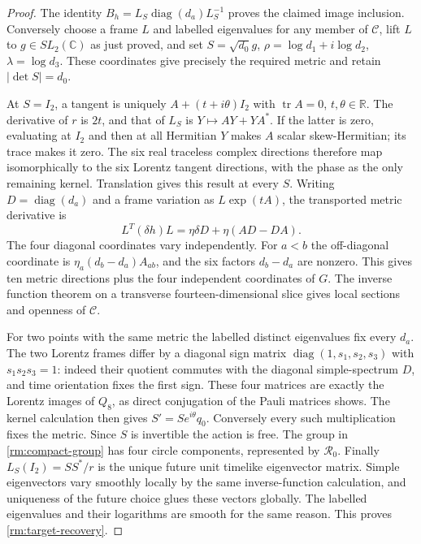 \begin{proof}
The identity $B_h=L_S\operatorname{diag}(d_a)L_S^{-1}$ proves the
claimed image inclusion. Conversely choose a frame $L$ and labelled
eigenvalues for any member of $\mathcal C$, lift $L$ to $g\in
SL_2(\mathbb C)$ as just proved, and set
$S=\sqrt{d_0}g$, $\rho=\log d_1+i\log d_2$,
$\lambda=\log d_3$. These coordinates give precisely the required
metric and retain $|\det S|=d_0$.

At $S=I_2$, a tangent is uniquely $A+(t+i\theta)I_2$ with
$\operatorname{tr}A=0$, $t,\theta\in\mathbb R$. The derivative of
$r$ is $2t$, and that of $L_S$ is $Y\mapsto AY+YA^*$.
If the latter is zero, evaluating at $I_2$ and then at all Hermitian
$Y$ makes $A$ scalar skew-Hermitian; its trace makes it zero.
The six real traceless complex directions therefore map isomorphically
to the six Lorentz tangent directions, with the phase as the only
remaining kernel. Translation gives this result at every $S$.
Writing $D=\operatorname{diag}(d_a)$ and a frame variation as
$L\exp(tA)$, the transported metric derivative is
\[
 L^T(\delta h)L=\eta\delta D+\eta(AD-DA).
\]
The four diagonal coordinates vary independently. For $a<b$ the
off-diagonal coordinate is $\eta_a(d_b-d_a)A_{ab}$, and the six
factors $d_b-d_a$ are nonzero. This gives ten metric directions plus
the four independent coordinates of $G$. The inverse function theorem
on a transverse fourteen-dimensional slice gives local sections and
openness of $\mathcal C$.

For two points with the same metric the labelled distinct eigenvalues
fix every $d_a$. The two Lorentz frames differ by a diagonal sign
matrix $\operatorname{diag}(1,s_1,s_2,s_3)$ with $s_1s_2s_3=1$:
indeed their quotient commutes with the diagonal simple-spectrum $D$,
and time orientation fixes the first sign. These four matrices are
exactly the Lorentz images of $Q_8$, as direct conjugation of the Pauli
matrices shows. The kernel calculation then gives $S'=Se^{i\theta}q_0$.
Conversely every such multiplication fixes the metric. Since $S$ is
invertible the action is free. The group in \eqref{rm:compact-group}
has four circle components, represented by $\mathcal R_0$.
Finally $L_S(I_2)=SS^*/r$ is the unique future unit timelike eigenvector
matrix. Simple eigenvectors vary smoothly locally by the same
inverse-function calculation, and uniqueness of the future choice
glues these vectors globally. The labelled eigenvalues and their
logarithms are smooth for the same reason. This proves
\eqref{rm:target-recovery}.
\end{proof}

